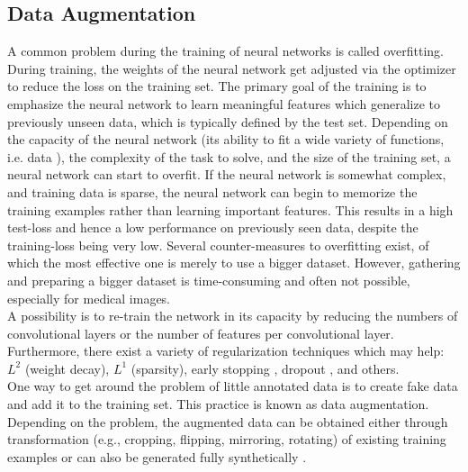 \subsection{Data Augmentation} \label{sec:trainig:data_augmentation}
A common problem during the training of neural networks is called overfitting. During training, the weights of the neural network get adjusted via the optimizer to reduce the loss on the training set. The primary goal of the training is to emphasize the neural network to learn meaningful features which generalize to previously unseen data, which is typically defined by the test set. 
Depending on the capacity of the neural network (its ability to fit a wide variety of functions, i.e. data \cite{Goodfellow2016DeepLearning}), the complexity of the task to solve, and the size of the training set, a neural network can start to overfit. If the neural network is somewhat complex, and training data is sparse, the neural network can begin to memorize the training examples rather than learning important features. This results in a high test-loss and hence a low performance on previously seen data, despite the training-loss being very low. Several counter-measures to overfitting exist, of which the most effective one is merely to use a bigger dataset. However, gathering and preparing a bigger dataset is time-consuming and often not possible, especially for medical images.\\
A possibility is to re-train the network in its capacity by reducing the numbers of convolutional layers or the number of features per convolutional layer.
Furthermore, there exist a variety of regularization techniques which may help:
$L^2$ (weight decay), $L^1$ (sparsity), early stopping \cite{Goodfellow2016DeepLearning}, dropout \cite{Srivastava2014Dropout:Overfitting}, and others.\\
One way to get around the problem of little annotated data is to create fake data and add it to the training set. This practice is known as data augmentation. Depending on the problem, the augmented data can be obtained either through transformation (e.g., cropping, flipping, mirroring, rotating) of existing training examples or can also be generated fully synthetically \cite{Tetteh2018DeepVesselNet:Volumes}.\\
